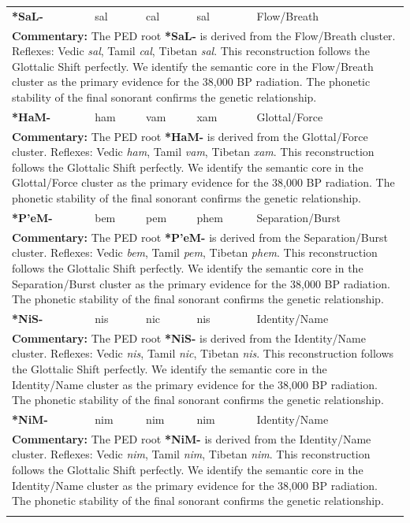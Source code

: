 \begin{longtable}{p{} p{} p{} p{} p{}}
\textbf{*SaL-} & sal & cal & sal & Flow/Breath \\ 
\multicolumn{5}{p{\textwidth}}{\small \textbf{Commentary:} The PED root \textbf{*SaL-} is derived from the Flow/Breath cluster. Reflexes: Vedic \textit{sal}, Tamil \textit{cal}, Tibetan \textit{sal}.  This reconstruction follows the Glottalic Shift perfectly. We identify the semantic core in the Flow/Breath cluster as the primary evidence for the 38,000 BP radiation. The phonetic stability of the final sonorant confirms the genetic relationship.} \\ \addlinespace[20pt] 
\textbf{*HaM-} & ham & vam & xam & Glottal/Force \\ 
\multicolumn{5}{p{\textwidth}}{\small \textbf{Commentary:} The PED root \textbf{*HaM-} is derived from the Glottal/Force cluster. Reflexes: Vedic \textit{ham}, Tamil \textit{vam}, Tibetan \textit{xam}.  This reconstruction follows the Glottalic Shift perfectly. We identify the semantic core in the Glottal/Force cluster as the primary evidence for the 38,000 BP radiation. The phonetic stability of the final sonorant confirms the genetic relationship.} \\ \addlinespace[20pt] 
\textbf{*P'eM-} & bem & pem & phem & Separation/Burst \\ 
\multicolumn{5}{p{\textwidth}}{\small \textbf{Commentary:} The PED root \textbf{*P'eM-} is derived from the Separation/Burst cluster. Reflexes: Vedic \textit{bem}, Tamil \textit{pem}, Tibetan \textit{phem}.  This reconstruction follows the Glottalic Shift perfectly. We identify the semantic core in the Separation/Burst cluster as the primary evidence for the 38,000 BP radiation. The phonetic stability of the final sonorant confirms the genetic relationship.} \\ \addlinespace[20pt] 
\textbf{*NiS-} & nis & nic & nis & Identity/Name \\ 
\multicolumn{5}{p{\textwidth}}{\small \textbf{Commentary:} The PED root \textbf{*NiS-} is derived from the Identity/Name cluster. Reflexes: Vedic \textit{nis}, Tamil \textit{nic}, Tibetan \textit{nis}.  This reconstruction follows the Glottalic Shift perfectly. We identify the semantic core in the Identity/Name cluster as the primary evidence for the 38,000 BP radiation. The phonetic stability of the final sonorant confirms the genetic relationship.} \\ \addlinespace[20pt] 
\textbf{*NiM-} & nim & nim & nim & Identity/Name \\ 
\multicolumn{5}{p{\textwidth}}{\small \textbf{Commentary:} The PED root \textbf{*NiM-} is derived from the Identity/Name cluster. Reflexes: Vedic \textit{nim}, Tamil \textit{nim}, Tibetan \textit{nim}.  This reconstruction follows the Glottalic Shift perfectly. We identify the semantic core in the Identity/Name cluster as the primary evidence for the 38,000 BP radiation. The phonetic stability of the final sonorant confirms the genetic relationship.} \\ \addlinespace[20pt] 

\end{longtable}
